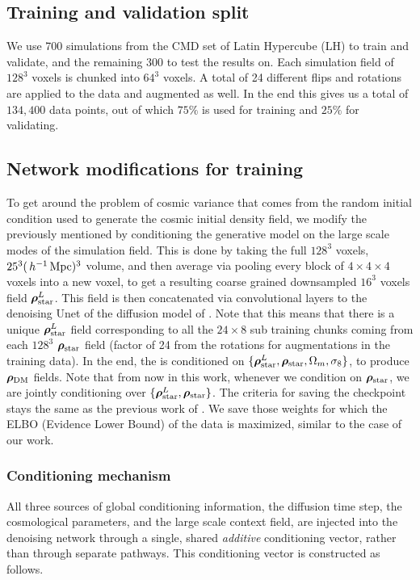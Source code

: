 \subsection{Training and validation split}
We use 700 simulations from the CMD set of Latin Hypercube (LH) to train and validate, and the remaining 300 to test the results on. Each simulation field of $128^3$ voxels is chunked into $64^3$ voxels. A total of 24 different flips and rotations are applied to the data and augmented as well. In the end this gives us a total of $134{,}400$ data points, out of which $75\%$ is used for training and $25\%$ for validating.

\subsection{Network modifications for training}
To get around the problem of cosmic variance that comes from the random initial condition used to generate the cosmic initial density field, we modify the previously mentioned \FOLD by conditioning the generative model on the large scale modes of the simulation field. This is done by taking the full $128^3$ voxels, $25^3(\,h^{-1}\,\mathrm{Mpc})^3$ volume, and then average via pooling every block of $4\times 4\times 4$ voxels into a new voxel, to get a resulting coarse grained downsampled $16^3$ voxels field $\bm{\rho}_\text{star}^L$. This field is then concatenated via convolutional layers to the denoising Unet of the diffusion model of \FOLD. Note that this means that there is a unique $\bm{\rho}_\text{star}^L$ field corresponding to all the $24\times8$ sub training chunks coming from each $128^3$ $\bm{\rho}_\text{star}$ field (factor of 24 from the rotations for augmentations in the training data). In the end, the \FOLD is conditioned on $\{\bm{\rho}_\text{star}^L,\bm{\rho}_\text{star},\Omega_m,\sigma_8\}$, to produce $\boldsymbol{\rho}_\mathrm{DM}$ fields. Note that from now in this work, whenever we condition on $\bm{\rho}_\text{star}$, we are jointly conditioning over $\{\bm{\rho}_\text{star}^L, \bm{\rho}_\text{star}\}$. The criteria for saving the checkpoint stays the same as the previous work of \FOLD. We save those weights for which the ELBO (Evidence Lower Bound) of the data is maximized, similar to the case of our \FOLD work.

\subsubsection{Conditioning mechanism}
\label{sec:cond_mechanism}

All three sources of global conditioning information, the diffusion time step, the cosmological parameters, and the large scale context field, are injected into the denoising network through a single, shared \emph{additive} conditioning vector, rather than through separate pathways. This conditioning vector is constructed as follows.

